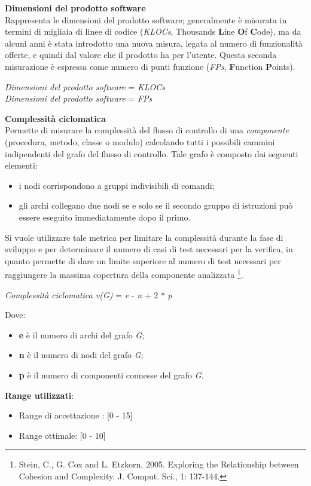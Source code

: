 \textbf{Dimensioni del prodotto software}\\

Rappresenta le dimensioni del prodotto software; generalmente \`e misurata in termini di migliaia di linee di codice (\textit{KLOCs}, Thousands \textbf{L}ine \textbf{O}f \textbf{C}ode), ma da alcuni anni è stata introdotto una nuova misura, legata al numero di funzionalità offerte, e quindi dal valore che il prodotto ha per l'utente. Questa seconda misurazione è espressa come numero di punti funzione (\textit{FPs}, \textbf{F}unction \textbf{P}oints). \\
\begin{center}
	\textit{Dimensioni del prodotto software} = \textit{KLOCs} \\
	\textit{Dimensioni del prodotto software} = \textit{FPs} 
\end{center}

\textbf{Complessità ciclomatica}\\

Permette di misurare la complessità del flusso di controllo di una \textit{componente} (procedura, metodo, classe o modulo) calcolando tutti i possibili cammini indipendenti del grafo del flusso di controllo. Tale grafo è composto dai seguenti elementi:
\begin{itemize}
	\item i nodi corrispondono a gruppi indivisibili di comandi;
	\item gli archi collegano due nodi se e solo se il secondo gruppo di istruzioni può essere eseguito immediatamente dopo il primo.
\end{itemize}
Si vuole utilizzare tale metrica per limitare la complessità durante la fase di sviluppo e per determinare il numero di casi di test necessari per la verifica, in quanto permette di dare un limite superiore al numero di test necessari per raggiungere la massima copertura della componente analizzata \footnote{Stein, C., G. Cox and L. Etzkorn, 2005. Exploring the Relationship between Cohesion and Complexity. J. Comput. Sci., 1: 137-144.}.
\begin{center}
	\textit{Complessità ciclomatica v(G)} = \textit{e} - \textit{n} + 2 * \textit{p}
\end{center}
Dove:
\begin{itemize}
	\item \textbf{e} è il numero di archi del grafo \textit{G};
	\item \textbf{n} è il numero di nodi del grafo \textit{G};
	\item \textbf{p} è il numero di componenti connesse del grafo \textit{G}.
\end{itemize}
\textbf{Range utilizzati}:
\begin{itemize}
	\item Range di accettazione : [0 - 15]
	\item Range ottimale: [0 - 10]
\end{itemize}

